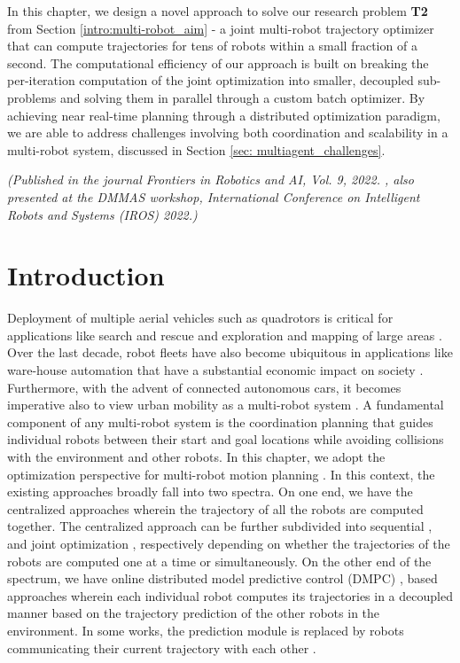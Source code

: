 
\noindent In this chapter, we design a novel approach to solve our research problem \textbf{T2} from Section \ref{intro:multi-robot_aim} - a joint multi-robot trajectory optimizer that can compute trajectories for tens of robots within a small fraction of a second. The computational efficiency of our approach is built on breaking the per-iteration computation of the joint optimization into smaller, decoupled sub-problems and solving them in parallel through a custom batch optimizer. By achieving near real-time planning through a distributed optimization paradigm, we are able to address challenges involving both coordination and scalability in a multi-robot system, discussed in Section \ref{sec: multiagent_challenges}.

{\small \textit{(Published in the journal Frontiers in Robotics and AI, Vol. 9, 2022.  \cite{self-gpu-mat}, also presented at the DMMAS workshop, International Conference on Intelligent Robots and Systems (IROS) 2022.)}}    


\section{Introduction}

Deployment of multiple aerial vehicles such as quadrotors is critical for applications like search and rescue and exploration and mapping of large areas \citep{schranz2020swarm}. Over the last decade, robot fleets have also become ubiquitous in applications like ware-house automation that have a substantial economic impact on society \citep{bolu2021adaptive,priority_seq}. Furthermore, with the advent of connected autonomous cars, it becomes imperative also to view urban mobility as a multi-robot system \citep{zhou2017collision}. A fundamental component of any multi-robot system is the coordination planning that guides individual robots between their start and goal locations while avoiding collisions with the environment and other robots. In this chapter, we adopt the optimization perspective for multi-robot motion planning \citep{aks_ral21}. In this context, the existing approaches broadly fall into two spectra. On one end, we have the centralized approaches wherein the trajectory of all the robots are computed together. The centralized approach can be further subdivided into sequential \citep{incremental_scp_how}, \cite{park2020efficient} and joint optimization \citep{rafaella_scp}, \citep{aks_ral21} respectively depending on whether the trajectories of the robots are computed one at a time or simultaneously. On the other end of the spectrum, we have online distributed model predictive control (DMPC) \citep{dmpc_carlos}, \citep{dmpc_epfl} based approaches wherein each individual robot computes its trajectories in a decoupled manner based on the trajectory prediction of the other robots in the environment. In some works, the prediction module is replaced by robots communicating their current trajectory with each other \citep{dmpc_carlos_2}. 

